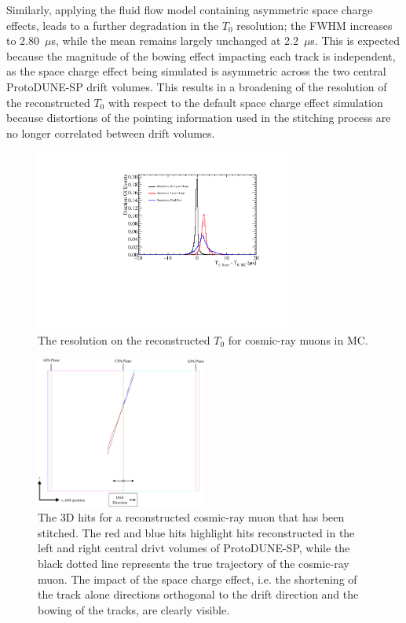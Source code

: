 Similarly, applying the fluid flow model containing asymmetric space charge effects, leads to a further degradation in the $T_{0}$ resolution; the FWHM increases to 2.80~$\mu$s, while the mean remains largely unchanged at 2.2~$\mu$s.  This is expected because the magnitude of the bowing effect impacting each track is independent, as the space charge effect being simulated is asymmetric across the two central ProtoDUNE-SP drift volumes.  This results in a broadening of the resolution of the reconstructed $T_{0}$ with respect to the default space charge effect simulation because distortions of the pointing information used in the stitching process are no longer correlated between drift volumes.

\begin{figure}
\centering
\includegraphics[width=0.75\textwidth]{Figures/Metrics/MC/Cosmics/CosmicRayT0Resolustion.pdf}
\caption{The resolution on the reconstructed $T_{0}$ for cosmic-ray muons in MC.}
\label{fig:crt0res}
\end{figure}

\begin{figure}
\centering
\includegraphics[width=0.5\textwidth]{Figures/EventDisplays/MC/SpaceChargeEffect.pdf}
\caption{The 3D hits for a reconstructed cosmic-ray muon that has been stitched.  The red and blue hits highlight hits reconstructed in the left and right central drivt volumes of ProtoDUNE-SP, while the black dotted line represents the true trajectory of the cosmic-ray muon.  The impact of the space charge effect, i.e. the shortening of the track alone directions orthogonal to the drift direction and the bowing of the tracks, are clearly visible.}
\label{fig:spacechargetrack}
\end{figure}

